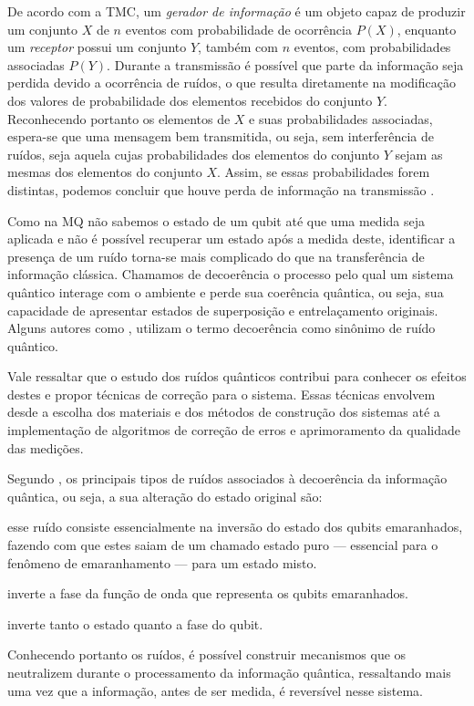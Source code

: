 De acordo com  a TMC, um \textit{gerador de informação} é um objeto capaz de produzir um conjunto $X$ de $n$ eventos com probabilidade de ocorrência $P(X)$, enquanto um \textit{receptor} possui um conjunto $Y$, também com $n$ eventos, com probabilidades associadas $P(Y)$. Durante a transmissão é possível que parte da informação seja perdida devido a ocorrência de ruídos, o que resulta diretamente na modificação dos valores de probabilidade dos elementos recebidos do conjunto $Y$. Reconhecendo portanto os elementos de $X$ e suas probabilidades associadas, espera-se que uma mensagem bem transmitida, ou seja, sem interferência de ruídos, seja aquela cujas probabilidades dos elementos do conjunto $Y$ sejam as mesmas dos elementos do conjunto $X$. Assim, se essas probabilidades forem distintas, podemos concluir que houve perda de informação na transmissão \cite{mathematical}.

Como na MQ não sabemos o estado de um qubit até que uma medida seja aplicada e não é possível recuperar um estado após a medida deste, identificar a presença de um ruído torna-se mais complicado do que na transferência de informação clássica. Chamamos de decoerência o processo pelo qual um sistema quântico interage com o ambiente e perde sua coerência quântica, ou seja, sua capacidade de apresentar estados de superposição e entrelaçamento originais. Alguns autores como \textcite{chuang}, utilizam o termo decoerência como sinônimo de ruído quântico.

Vale ressaltar que o estudo dos ruídos quânticos contribui para conhecer os efeitos destes e propor técnicas de correção para o sistema. Essas técnicas envolvem desde a escolha dos materiais e dos métodos de construção dos sistemas até a implementação de algoritmos de correção de erros e aprimoramento da qualidade das medições.

Segundo \textcite{teseufscar}, os principais tipos de ruídos associados à decoerência da informação quântica, ou seja, a sua alteração do estado original são:

\begin{description}\label{tiposruidos}
  \item [Inversão de bit (\textit{bitflip})] esse ruído consiste essencialmente na inversão do estado dos qubits emaranhados, fazendo com que estes saiam de um chamado estado puro --- essencial para o fenômeno de emaranhamento --- para um estado misto.
  \item [Inversão de fase (\textit{phaseflip})] inverte a fase da função de onda que representa os qubits emaranhados.
  \item [Inversão de bit e fase (\textit{bit-phase flip})] inverte tanto o estado quanto a fase do qubit.
\end{description}

Conhecendo portanto os ruídos, é possível construir mecanismos que os neutralizem durante o processamento da informação quântica, ressaltando mais uma vez que a informação, antes de ser medida, é reversível nesse sistema.

